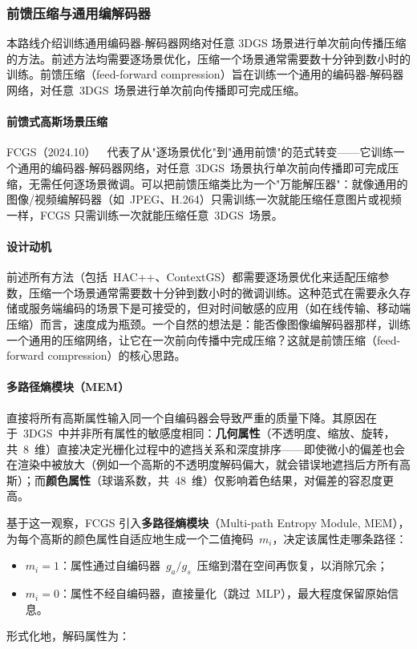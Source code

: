 \subsubsection{前馈压缩与通用编解码器}

本路线介绍训练通用编码器-解码器网络对任意 3DGS 场景进行单次前向传播压缩的方法。前述方法均需要逐场景优化，压缩一个场景通常需要数十分钟到数小时的训练。前馈压缩（feed-forward compression）旨在训练一个通用的编码器-解码器网络，对任意~3DGS~场景进行单次前向传播即可完成压缩。

\paragraph{前馈式高斯场景压缩}

FCGS（2024.10）~\cite{2410_08017}~代表了从"逐场景优化"到"通用前馈"的范式转变——它训练一个通用的编码器-解码器网络，对任意~3DGS~场景执行单次前向传播即可完成压缩，无需任何逐场景微调。可以把前馈压缩类比为一个"万能解压器"：就像通用的图像/视频编解码器（如~JPEG、H.264）只需训练一次就能压缩任意图片或视频一样，FCGS 只需训练一次就能压缩任意~3DGS~场景。

\paragraph{设计动机}

前述所有方法（包括~HAC++、ContextGS）都需要逐场景优化来适配压缩参数，压缩一个场景通常需要数十分钟到数小时的微调训练。这种范式在需要永久存储或服务端编码的场景下是可接受的，但对时间敏感的应用（如在线传输、移动端压缩）而言，速度成为瓶颈。一个自然的想法是：能否像图像编解码器那样，训练一个通用的压缩网络，让它在一次前向传播中完成压缩？这就是前馈压缩（feed-forward compression）的核心思路。

\paragraph{多路径熵模块（MEM）}

直接将所有高斯属性输入同一个自编码器会导致严重的质量下降。其原因在于~3DGS~中并非所有属性的敏感度相同：\textbf{几何属性}（不透明度、缩放、旋转，共~8~维）直接决定光栅化过程中的遮挡关系和深度排序——即使微小的偏差也会在渲染中被放大（例如一个高斯的不透明度解码偏大，就会错误地遮挡后方所有高斯）；而\textbf{颜色属性}（球谐系数，共~48~维）仅影响着色结果，对偏差的容忍度更高。

基于这一观察，FCGS 引入\textbf{多路径熵模块}（Multi-path Entropy Module, MEM），为每个高斯的颜色属性自适应地生成一个二值掩码~$m_i$，决定该属性走哪条路径：
\begin{itemize}
\item $m_i = 1$：属性通过自编码器~$g_a / g_s$~压缩到潜在空间再恢复，以消除冗余；
\item $m_i = 0$：属性不经自编码器，直接量化（跳过~MLP），最大程度保留原始信息。
\end{itemize}
形式化地，解码属性为：


